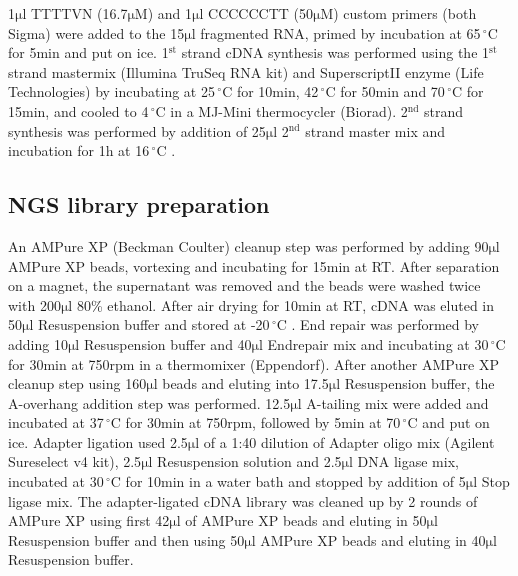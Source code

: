 \documentclass[10pt]{article}
\newcommand{\mul}{\ensuremath{\mathrm{\mu l}} }
\newcommand{\C}{\,$^{\circ}\mathrm{C}$ }
\begin{document}
1\mul TTTTVN (16.7$\mathrm{\mu M}$) and 1\mul CCCCCCTT (50$\mathrm{\mu M}$) custom primers (both Sigma) were added to the 15\mul fragmented RNA, primed by incubation at 65\C for 5min and put on ice. 1$^\mathrm{st}$ strand cDNA synthesis was performed using the 1$^\mathrm{st}$ strand mastermix (Illumina TruSeq RNA kit) and SuperscriptII enzyme (Life Technologies) by incubating at 25\C for 10min, 42\C for 50min and 70\C for 15min, and cooled to 4\C in a MJ-Mini thermocycler (Biorad). 2$^\mathrm{nd}$ strand synthesis was performed by addition of 25\mul 2$^\mathrm{nd}$ strand master mix and incubation for 1h at 16\C.

\subsection*{NGS library preparation}

An AMPure XP (Beckman Coulter) cleanup step was performed by adding 90\mul AMPure XP beads, vortexing and incubating for 15min at RT. After separation on a magnet, the supernatant was removed and the beads were washed twice with 200\mul 80\% ethanol. After air drying for 10min at RT, cDNA was eluted in 50\mul Resuspension buffer and stored at -20\C.
End repair was performed by adding 10\mul Resuspension buffer and 40\mul Endrepair mix and incubating at 30\C for 30min at 750rpm in a thermomixer (Eppendorf).
After another AMPure XP cleanup step using 160\mul beads and eluting into 17.5\mul Resuspension buffer, the A-overhang addition step was performed. 12.5\mul A-tailing mix were added and incubated at 37\C for 30min at 750rpm, followed by 5min at 70\C and put on ice. Adapter ligation used 2.5\mul of a 1:40 dilution of Adapter oligo mix (Agilent Sureselect v4 kit), 2.5\mul Resuspension solution and 2.5\mul DNA ligase mix, incubated at 30\C for 10min in a water bath and stopped by addition of 5\mul Stop ligase mix. The adapter-ligated cDNA library was cleaned up by 2 rounds of AMPure XP using first 42\mul of AMPure XP beads and eluting in 50\mul Resuspension buffer and then using 50\mul AMPure XP beads and eluting in 40\mul Resuspension buffer.
\end{document}
